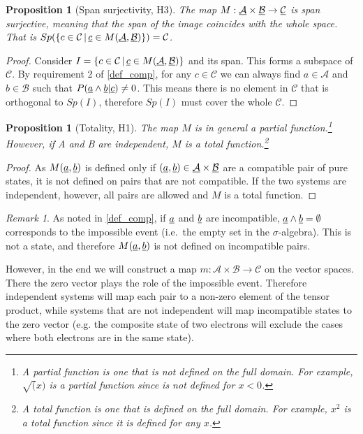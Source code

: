 \documentclass[aps,prl,amsmath,amssymb,twocolumn,nofootinbib]{revtex4}
\theoremstyle{plain}
\newtheorem{prop}[thrm]{Proposition}
\theoremstyle{definition}
\theoremstyle{remark}
\newtheorem*{remark}{Remark}
\newcommand{\pj}[1] {\underbar{$#1$}}
\begin{document}
	\begin{prop}[Span surjectivity, H3]\label{prop_spanSurj}
		The map $M :
		\pj{\mathcal{A}}\times\pj{\mathcal{B}} \to \pj{\mathcal{C}}$ is span
		surjective, meaning that the span of the image coincides with the
		whole space. That is $Sp(\{ c \in \mathcal{C} \, | \, \pj{c} \in
		M(\pj{\mathcal{A}}, \pj{\mathcal{B}})\}) = \mathcal{C}$.
	\end{prop}
	\begin{proof}
		Consider $I=\{ c \in \mathcal{C} \, | \, \pj{c} \in M(\pj{\mathcal{A}}, \pj{\mathcal{B}})\}$ and its span. This forms a subspace of $\mathcal{C}$. By requirement 2 of \ref{def_comp}, for any $c \in \mathcal{C}$ we can always find $a \in \mathcal{A}$ and $b \in \mathcal{B}$ such that $P(\pj{a} \wedge \pj{b} | \pj{c} )\neq 0$. This means there is no element in $\mathcal{C}$ that is orthogonal to $Sp(I)$, therefore $Sp(I)$ must cover the whole $\mathcal{C}$.
	\end{proof}
	
	\begin{prop}[Totality, H1]\label{prop_totality}
		The map $M$ is in general a partial function.\footnote{A partial
			function is one that is not defined on the full domain. For
			example, $\sqrt(x)$ is a partial function since is not defined for
			$x<0$.} However, if A and B are independent, $M$ is a total function.\footnote{A total function is one that is defined on the full domain. For example, $x^2$ is a total function since it is defined for any $x$.}
	\end{prop}
	\begin{proof}
		As $M(\pj{a},\pj{b})$ is defined only if $(\pj{a},\pj{b}) \in \pj{\mathcal{A}}\times\pj{\mathcal{B}}$ are a compatible pair of pure states, it is not defined on pairs that are not compatible. If the two systems are independent, however, all pairs are allowed and $M$ is a total function.
	\end{proof}
	
	\begin{remark}
		As noted in \ref{def_comp}, if $\pj{a}$ and $\pj{b}$ are incompatible, $\pj{a} \wedge \pj{b}=\emptyset$ corresponds to the impossible event (i.e.~the empty set in the $\sigma$-algebra). This is not a state, and therefore $M(\pj{a},\pj{b})$ is not defined on incompatible pairs.
		
		However, in the end we will construct a map $m : \mathcal{A} \times \mathcal{B} \to \mathcal{C}$ on the vector spaces. There the zero vector plays the role of the impossible event. Therefore independent systems will map each pair to a non-zero element of the tensor product, while systems that are not independent will map incompatible states to the zero vector (e.g. the composite state of two electrons will exclude the cases where both electrons are in the same state).
	\end{remark}
	
\end{document}
